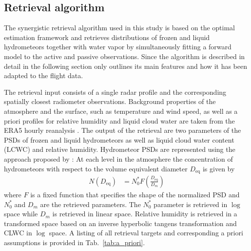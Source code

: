 \documentclass[journal abbreviation, manuscript]{copernicus}
\begin{document}
\subsection{Retrieval algorithm}
\label{sec:synergistic_retrieval}

The synergistic retrieval algorithm used in this study is based on the optimal
estimation framework \citep{rodgers00} and retrieves distributions of frozen and
liquid hydrometeors together with water vapor by simultaneously fitting a
forward model to the active and passive observations. Since the algorithm is
described in detail in \citet{pfreundschuh20} the following section only
outlines its main features and how it has been adapted to the flight data.

The retrieval input consists of a single radar profile and the corresponding
spatially closest radiometer observations. Background properties of the
atmosphere and the surface, such as temperature and wind speed, as well as a
priori profiles for relative humidity and liquid cloud water are taken from the
ERA5 hourly reanalysis \citep{era5}. The output of the retrieval are two
parameters of the PSDs of frozen and liquid hydrometeors as well as liquid cloud
water content (LCWC) and relative humidity. Hydrometeor PSDs are represented
using the approach proposed by \citet{delanoe05}: At each level in the
atmosphere the concentration of hydrometeors with respect to the volume
equivalent diameter $D_\text{eq}$ is given by
\begin{align}\label{eq:psd}
  N(D_\text{eq}) &= N_0^{*}F(\frac{D_\text{eq}}{D_m})
\end{align}
where $F$ is a fixed function that specifies the shape of the normalized PSD and
$N_0^{*}$ and $D_m$ are the retrieved parameters. The $N_0^{*}$ parameter is
retrieved in $\log$ space while $D_m$ is retrieved in linear space. Relative
humidity is retrieved in a transformed space based on an inverse hyperbolic
tangens transformation and CLWC in $\log$ space. A listing
of all retrieval targets and corresponding a priori assumptions is provided in
Tab.~\ref{tab:a_priori}.
\end{document}
